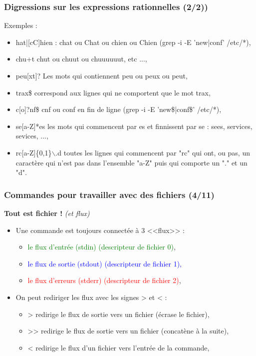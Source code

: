 \documentclass[handout,10pt]{beamer}
\begin{document}
\frame
{
    \frametitle{Digressions sur les expressions rationnelles (2/2))}

    Exemples :

    \begin{itemize}
        \item {\ttfamily [cC]hat|[cC]hien} : chat ou Chat ou chien ou Chien (grep -i -E 'new|conf' /etc/*),
        \item {\ttfamily chu+t} chut ou chuut ou chuuuuuut, etc ...,
        \item {\ttfamily peu[xt]?} Les mots qui contiennent peu ou peux ou peut,
        \item {\ttfamily \circonflexe trax\$} correspond aux lignes qui ne comportent que le mot trax,
        \item {\ttfamily c[o]?nf\$} cnf ou conf en fin de ligne (grep -i -E 'new\$|conf\$' /etc/*),
        \item {\ttfamily se[a-Z]*es} les mots qui commencent par es et finnissent par se : sees, services, sevices, ...,
        \item {\ttfamily \circonflexe rc[\circonflexe a-Z]\{0,1\}$\backslash$.d} toutes les lignes qui commencent par "rc" qui ont, ou pas, un caractère qui n'est pas dans l'ensemble "a-Z" puis qui comporte un "." et un "d".
    \end{itemize}
}


\frame
{
    \frametitle{Commandes pour travailler avec des fichiers (4/11)}

    \begin{center}{\textbf{Tout est fichier !}} {\textit{(et flux)}}\end{center}

    \begin{itemize}
        \item Une commande est toujours connectée à 3 <<flux>> :
            \begin{itemize}
                \item \textcolor{green}{le flux d'entrée (stdin)   (descripteur de fichier 0)},
                \item  \textcolor{blue}{le flux de sortie (stdout) (descripteur de fichier 1),}
                \item \textcolor{red}{le flux d'erreurs (stderr) (descripteur de fichier 2)},
            \end{itemize}
        \item On peut rediriger les flux avec les signes {\ttfamily >} et {\ttfamily <} :
            \begin{itemize}
                \item {\ttfamily >} redirige le flux de sortie vers un fichier (écrase le fichier),
                \item {\ttfamily >>} redirige le flux de sortie vers un fichier (concatène à la suite),
                \item {\ttfamily <} redirige le flux d'un fichier vers l'entrée de la commande,
            \end{itemize}
    \end{itemize}
}
\end{document}
